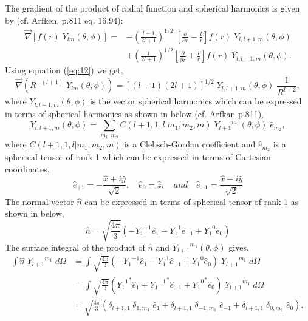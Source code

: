 The gradient of the product of radial function and spherical harmonics
is given by (cf. Arfken, p.811 eq. 16.94):
\begin{equation}
\begin{split}
\vec{\nabla}\left[ f(r)\;Y_{lm}(\theta, \phi)\right] = &-\left(\frac{l+1}{2l+1}\right)^{1/2}\; \left[\frac{\partial}{\partial r}-\frac{l}{r} \right]f(r)\; Y_{l, l+1, m}(\theta, \phi)\\ &+ \left(\frac{l}{2l+1}\right)^{1/2}\left[\frac
{\partial}{\partial r}+\frac{l}{r} \right]f(r)\; Y_{l, l-1, m}(\theta, \phi).
\end{split}
\label{eq:12}
\end{equation}
Using equation (\ref{eq:12}) we get,
\begin{equation}
\vec{\nabla}\left({R^{-(l+1)}}\;Y_{lm}(\theta, \phi)\right) = [(l+1)(2l+1)]^{1/2}\; Y_{l,l+1,m}(\theta, \phi) \; \frac{1}{R^{l+2}},
\label{eq:13}
\end{equation}
where $ Y_{l,l+1,m}(\theta, \phi)$ is the vector spherical harmonics
which can be expressed in terms of spherical harmonics as shown in
below (cf. Arfkan p.811),
\begin{equation}
Y_{l,l+1,m}(\theta, \phi) = \sum_{m_1, m_2} C(l+1,1,l|m_1,m_2,m)\; {Y_{l+1}}^{m_1}(\theta,\phi)\; \hat{e}_{m_2},
\label{eq:14}
\end{equation}
where $C(l+1,1,l|m_1,m_2,m)$ is a Clebsch-Gordan coefficient and
$\hat{e}_{m_2}$ is a spherical tensor of rank 1 which can be expressed
in terms of Cartesian coordinates,
\begin{equation}
{\hat{e}}_{+1} = - \frac{\hat{x}+i\hat{y}}{\sqrt{2}},\quad {\hat{e}}_{0} = \hat{z},\quad and \quad {\hat{e}}_{-1} = \frac{\hat{x}-i\hat{y}}{\sqrt{2}}
\label{eq:15}
\end{equation} 
The normal vector $\hat{n} $ can be expressed in terms of spherical tensor of rank 1 as shown in below,
\begin{equation}
\hat{n} = \sqrt{\frac{4\pi}{3}}\left(-{Y_1}^{-1}{\hat{e}}_1 -{Y_1}^{1}{\hat{e}}_{-1} + {Y_1}^{0}{\hat{e}}_0 \right)
\label{eq:16}
\end{equation}
The surface integral of the product of $\hat{n}$ and
${Y_{l+1}}^{m_1}(\theta, \phi)$ gives,
\begin{equation}
\begin{split}
\int \hat{n}\;{Y_{l+1}}^{m_1}\;d\Omega &= \int \sqrt{\frac{4\pi}{3}}\left(-{Y_1}^{-1}{\hat{e}}_1 -{Y_1}^{1}{\hat{e}}_{-1} + {Y_1}^{0}{\hat{e}}_0 \right)\;{Y_{l+1}}^{m_1}\; d\Omega \\
&=  \int \sqrt{\frac{4\pi}{3}}\left({{Y_1}^{1}}^* {\hat{e}}_1 +{{Y_1}^{-1}}^* {\hat{e}}_{-1} + {{Y_1}^{0}}^* {\hat{e}}_0 \right)\;{Y_{l+1}}^{m_1}\; d\Omega \\
&=   \sqrt{\frac{4\pi}{3}}\left({\delta}_{l+1, 1}\;{\delta}_{1, m_1}\;{\hat{e}}_1 + {\delta}_{l+1, 1}\;{\delta}_{-1, m_1}\;{\hat{e}}_{-1}+ {\delta}_{l+1, 1}\;{\delta}_{0, m_1} \;{\hat{e}}_0\right),
\end{split}
\label{eq:17}
\end{equation}
